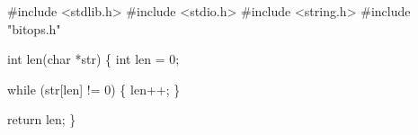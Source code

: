 \textcolor{PreProc}{#include }\textcolor{Constant}{<stdlib.h>}
\textcolor{PreProc}{#include }\textcolor{Constant}{<stdio.h>}
\textcolor{PreProc}{#include }\textcolor{Constant}{<string.h>}
\textcolor{PreProc}{#include }\textcolor{Constant}{"bitops.h"}

\textcolor{Type}{int} len(\textcolor{Type}{char} *str)
\{
  \textcolor{Type}{int} len = \textcolor{Constant}{0};

  \textcolor{Statement}{while} (str[len] != \textcolor{Constant}{0})
  \{
    len++;
  \}

  \textcolor{Statement}{return} len;
\}
